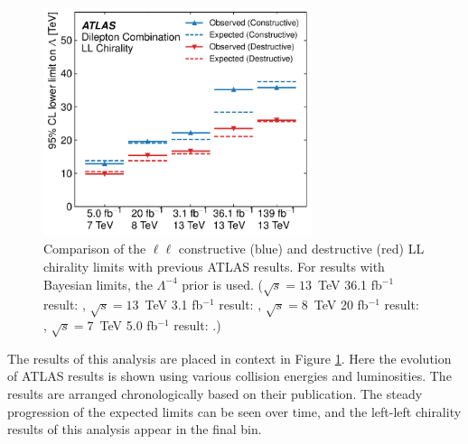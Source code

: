 \begin{figure}[h!]
\centering
\includegraphics[width=0.70\textwidth]{figures/ci/results/figaux_05.pdf}
\caption{Comparison of the $\ell\ell$ constructive (blue) and destructive (red) LL chirality limits with previous ATLAS results. For results with Bayesian limits, the $\Lambda^{-4}$ prior is used. ($\sqrt{s}=13$~TeV 36.1 fb$^{-1}$ result: \cite{EXOT-2016-05}, $\sqrt{s}=13$~TeV 3.1 fb$^{-1}$ result: \cite{EXOT-2015-07}, $\sqrt{s}=8$~TeV 20 fb$^{-1}$ result: \cite{EXOT-2013-19}, $\sqrt{s}=7$~TeV 5.0 fb$^{-1}$ result: \cite{EXOT-2012-17}.)}
\label{fig:ciHistoricalLimits}
\end{figure}

The results of this analysis are placed in context in Figure \ref{fig:ciHistoricalLimits}.
Here the evolution of ATLAS results is shown using various collision energies and luminosities.
The results are arranged chronologically based on their publication.
The steady progression of the expected limits can be seen over time, and the left-left chirality results of this analysis appear in the final bin.


